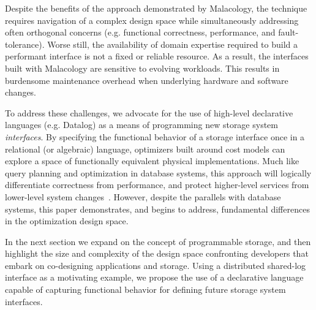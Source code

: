 Despite the benefits of the approach demonstrated by Malacology, the technique
requires navigation of
a complex design space while simultaneously addressing often orthogonal
concerns (e.g. functional correctness, performance, and fault-tolerance).
Worse still, the availability of domain expertise required to build a performant interface is not a fixed or reliable resource. 
As a result, the interfaces built with Malacology are sensitive to evolving
workloads. This results in burdensome maintenance overhead when underlying
hardware and software changes.

To address these challenges, we advocate for the use of high-level declarative
languages (e.g. Datalog) as a means of programming new storage system
\emph{interfaces}.  By specifying the functional behavior of a storage interface once
in a relational (or algebraic) language, optimizers built around cost models
can explore a space of
functionally equivalent physical implementations. Much like query planning and
optimization in database systems, this approach will logically differentiate
correctness from performance, and protect higher-level services from lower-level
system changes~\cite{sel79}. However, despite the parallels with database systems, this
paper demonstrates, and begins to address, fundamental differences in the
optimization design space.

In the next section we expand on the concept of programmable storage, and then
highlight the size and complexity of the design space confronting developers
that embark on co-designing applications and storage.  Using a distributed
shared-log interface as a motivating example, we propose the use of a
declarative language capable of capturing functional behavior for defining
future storage system interfaces.
